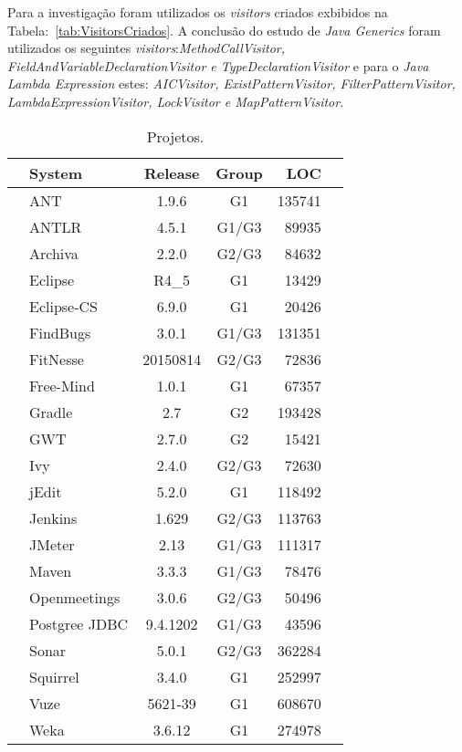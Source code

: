 Para a investigação foram utilizados os \textit{visitors} criados exbibidos na  Tabela:~\ref{tab:VisitorsCriados}. A conclusão do estudo de \textit{Java Generics} foram utilizados os seguintes \textit{visitors}:\textit{MethodCallVisitor, FieldAndVariableDeclarationVisitor e TypeDeclarationVisitor} e para o \textit{Java Lambda Expression} estes: \textit{AICVisitor, ExistPatternVisitor, FilterPatternVisitor, LambdaExpressionVisitor, LockVisitor e MapPatternVisitor}.




\begin{table}[h]\footnotesize
\centering
	\caption{Projetos.}
	\begin{tabular}{l|lccrr}\hline
		 & \textbf{System} & \textbf{Release} & \textbf{Group}  & \textbf{LOC} \\\hline \hline
		\multirow{22}{*}{\rotatebox[origin=c]{90}{\textbf{Application}}} 
																 & ANT & 1.9.6 & G1 & 135741\\
																 & ANTLR  & 4.5.1 & G1/G3 & 89935 \\
																 & Archiva  & 2.2.0 & G2/G3 & 84632\\
																 & Eclipse & R4\_5 & G1 & 13429\\
																 & Eclipse-CS & 6.9.0 & G1 & 20426\\
																 & FindBugs & 3.0.1 & G1/G3 & 131351\\
																 & FitNesse & 20150814 & G2/G3 & 72836\\
																 & Free-Mind & 1.0.1 & G1 & 67357\\
																 & Gradle & 2.7 & G2 & 193428\\
																 & GWT & 2.7.0 & G2 & 15421\\
																 & Ivy & 2.4.0 & G2/G3 & 72630\\
																 & jEdit & 5.2.0 & G1 & 118492\\
						   									     & Jenkins & 1.629 & G2/G3 & 113763\\
																 & JMeter & 2.13 & G1/G3 & 111317\\
																 & Maven & 3.3.3 & G1/G3 & 78476\\
																 & Openmeetings & 3.0.6 & G2/G3 & 50496\\
																 & Postgree JDBC & 9.4.1202 & G1/G3 & 43596\\ 
																 & Sonar & 5.0.1 & G2/G3 & 362284\\
																 & Squirrel & 3.4.0 & G1 & 252997\\
																 & Vuze & 5621-39 & G1 & 608670\\
																 & Weka & 3.6.12 & G1 & 274978\\
																 \hline
					

\end{tabular}
\end{table}
